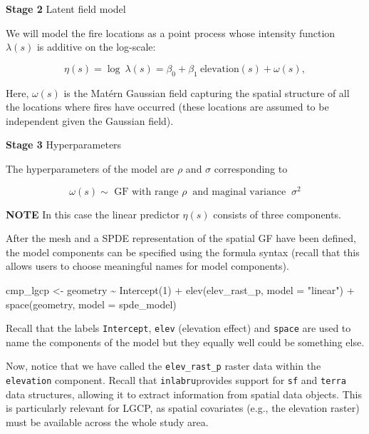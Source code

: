 \documentclass[
  letterpaper,
  DIV=11,
  numbers=noendperiod]{scrartcl}
\newenvironment{Shaded}{\begin{snugshade}}{\end{snugshade}}
\newcommand{\AttributeTok}[1]{\textcolor[rgb]{0.40,0.45,0.13}{#1}}
\newcommand{\DecValTok}[1]{\textcolor[rgb]{0.68,0.00,0.00}{#1}}
\newcommand{\FunctionTok}[1]{\textcolor[rgb]{0.28,0.35,0.67}{#1}}
\newcommand{\NormalTok}[1]{\textcolor[rgb]{0.00,0.23,0.31}{#1}}
\newcommand{\OtherTok}[1]{\textcolor[rgb]{0.00,0.23,0.31}{#1}}
\newcommand{\SpecialCharTok}[1]{\textcolor[rgb]{0.37,0.37,0.37}{#1}}
\newcommand{\StringTok}[1]{\textcolor[rgb]{0.13,0.47,0.30}{#1}}
\begin{document}
\textbf{Stage 2} Latent field model

We will model the fire locations as a point process whose intensity
function \(\lambda(s)\) is additive on the log-scale:

\[
\eta(s) = \log ~ \lambda(s)= \beta_0 +  \beta_1 ~ \text{elevation}(s) + \omega(s),
\]

Here, \(\omega(s)\) is the Matérn Gaussian field capturing the spatial
structure of all the locations where fires have occurred (these
locations are assumed to be independent given the Gaussian field).

\textbf{Stage 3} Hyperparameters

The hyperparameters of the model are \(\rho\) and \(\sigma\)
corresponding to

\[
\omega(s)\sim \text{  GF with range } \rho\  \text{ and maginal variance }\ \sigma^2
\]

\textbf{NOTE} In this case the linear predictor \(\eta(s)\) consists of
three components.

After the mesh and a SPDE representation of the spatial GF have been
defined, the model components can be specified using the formula syntax
(recall that this allows users to choose meaningful names for model
components).

\begin{Shaded}
\begin{Highlighting}[]
\NormalTok{cmp\_lgcp }\OtherTok{\textless{}{-}}\NormalTok{  geometry }\SpecialCharTok{\textasciitilde{}}  \FunctionTok{Intercept}\NormalTok{(}\DecValTok{1}\NormalTok{)  }\SpecialCharTok{+} 
  \FunctionTok{elev}\NormalTok{(elev\_rast\_p, }\AttributeTok{model =} \StringTok{"linear"}\NormalTok{) }\SpecialCharTok{+}
  \FunctionTok{space}\NormalTok{(geometry, }\AttributeTok{model =}\NormalTok{ spde\_model)}
\end{Highlighting}
\end{Shaded}

Recall that the labels \texttt{Intercept}, \texttt{elev} (elevation
effect) and \texttt{space} are used to name the components of the model
but they equally well could be something else.

Now, notice that we have called the \texttt{elev\_rast\_p} raster data
within the \texttt{elevation} component. Recall that
\texttt{inlabru}provides support for \texttt{sf} and \texttt{terra} data
structures, allowing it to extract information from spatial data
objects. This is particularly relevant for LGCP, as spatial covariates
(e.g., the elevation raster) must be available across the whole study
area.
\end{document}

